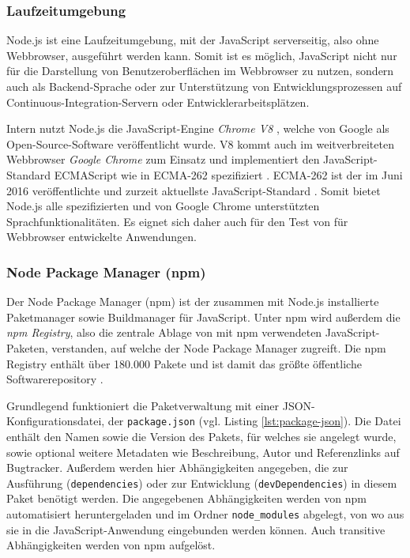 \subsubsection{Laufzeitumgebung}
Node.js ist eine Laufzeitumgebung, mit der JavaScript serverseitig, also ohne Webbrowser, ausgeführt werden kann\cite[][1]{hughes2012einfuehrungnodejs}. Somit ist es möglich, JavaScript nicht nur für die Darstellung von Benutzeroberflächen im Webbrowser zu nutzen, sondern auch als Backend-Sprache oder zur Unterstützung von Entwicklungsprozessen auf Continuous-Integration-Servern oder Entwicklerarbeitsplätzen.

Intern nutzt Node.js die JavaScript-Engine \textit{Chrome V8}  \cite{nodejs}, welche von Google als Open-Source-Software veröffentlicht wurde. V8 kommt auch im weitverbreiteten Webbrowser \textit{Google Chrome} zum Einsatz und implementiert den JavaScript-Standard ECMAScript wie in ECMA-262 spezifiziert \cite{chromev8}. ECMA-262 ist der im Juni 2016 veröffentlichte und zurzeit aktuellste JavaScript-Standard \cite{ecma262}. Somit bietet Node.js alle spezifizierten und von Google Chrome unterstützten Sprachfunktionalitäten. Es eignet sich daher auch für den Test von für Webbrowser entwickelte Anwendungen.

\subsubsection{Node Package Manager (npm)}
Der Node Package Manager (npm) ist der zusammen mit Node.js installierte Paketmanager sowie Buildmanager für JavaScript. Unter npm wird außerdem die \textit{npm Registry}, also die zentrale Ablage von mit npm verwendeten JavaScript-Paketen, verstanden, auf welche der Node Package Manager zugreift.  \cite{npm-about} Die npm Registry enthält über 180.000 Pakete und ist damit das größte öffentliche Softwarerepository \cite{modulecount}.

Grundlegend funktioniert die Paketverwaltung mit einer JSON-Konfigurationsdatei, der \texttt{package.json} (vgl. Listing \ref{lst:package-json}). Die Datei enthält den Namen sowie die Version des Pakets, für welches sie angelegt wurde, sowie optional weitere Metadaten wie Beschreibung, Autor und Referenzlinks auf Bugtracker. Außerdem werden hier Abhängigkeiten angegeben, die zur Ausführung (\texttt{dependencies}) oder zur Entwicklung (\texttt{devDependencies}) in diesem Paket benötigt werden. \cite{npm-packagejson} Die angegebenen Abhängigkeiten werden von npm automatisiert heruntergeladen und im Ordner \texttt{node\_modules} abgelegt, von wo aus sie in die JavaScript-Anwendung eingebunden werden können. Auch transitive Abhängigkeiten werden von npm aufgelöst. \cite{npm-install}

